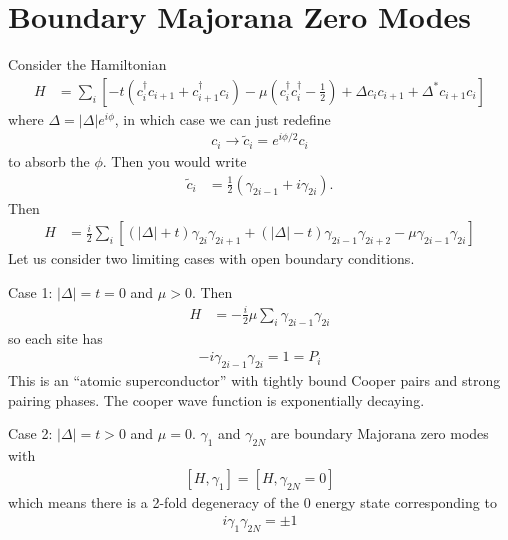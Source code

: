 \section{Boundary Majorana Zero Modes}
Consider the Hamiltonian
\begin{align}
    H &=
    \sum_{i}\left[
        -t \left( c_i^\dagger c_{i + 1} + c_{i+1}^\dagger c_i\right)
        - \mu\left( c_i^\dagger c_i^\dagger - \frac{1}{2} \right)
        + \Delta c_i c_{i+1}
        + \Delta^* c_{i+1}c_{i}
    \right]
\end{align}
where $\Delta = |\Delta| e^{i\phi}$,
in which case we can just redefine
\begin{align}
    c_i \to \tilde{c}_i = e^{i\phi/2}c_i
\end{align}
to absorb the $\phi$.
Then you would write
\begin{align}
    \tilde{c}_i &= \frac{1}{2}
    \left( \gamma_{2i - 1} + i\gamma_{2i} \right).
\end{align}
Then
\begin{align}
    H &= \frac{i}{2}\sum_{i}\left[
        \left( |\Delta| + t \right)\gamma_{2i}\gamma_{2i+1}
        + \left( |\Delta| - t \right) \gamma_{2i - 1} \gamma_{2i + 2}
        - \mu \gamma_{2i - 1} \gamma_{2i}
    \right]
\end{align}
Let us consider two limiting cases with open boundary conditions.

Case 1: $|\Delta| = t = 0$ and $\mu > 0$.
Then
\begin{align}
    H &= -\frac{i}{2}\mu\sum_{i}\gamma_{2i - 1}\gamma_{2i}
\end{align}
so each site has
\begin{align}
    -i\gamma_{2i - 1}\gamma_{2i} = 1 = P_i
\end{align}
This is an ``atomic superconductor''
with tightly bound Cooper pairs
and strong pairing phases.
The cooper wave function is exponentially decaying.

Case 2: $|\Delta| = t > 0$ and $\mu = 0$.
$\gamma_1$ and $\gamma_{2N}$ are boundary Majorana zero modes with
\begin{align}
    \left[ H, \gamma_1 \right] =
    \left[ H, \gamma_{2N} = 0 \right]
\end{align}
which means there is a 2-fold degeneracy of the 0 energy state
corresponding to
\begin{align}
    i\gamma_1 \gamma_{2N} = \pm 1
\end{align}

